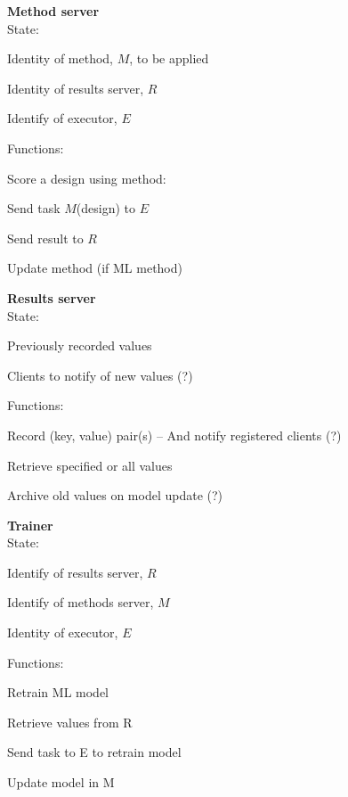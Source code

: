 \documentclass[10pt]{article}
\begin{document}
\noindent
\textbf{Method server}\\
State:
\begin{compactitem}
\item
Identity of method, $M$, to be applied
\item
Identity of results server, $R$
\item
Identify of executor, $E$
\end{compactitem}
Functions:
\begin{compactitem}
\item 
Score a design using method:
\begin{compactitem}
\item
Send task $M$(design) to $E$
\item
Send result to $R$
\end{compactitem}
\item
Update method (if ML method) 
\end{compactitem}

\vspace{1ex}

\noindent
\textbf{Results server}\\
State:
\begin{compactitem}
\item
Previously recorded values
\item
Clients to notify of new values (?)
\end{compactitem}
Functions:
\begin{compactitem}
\item
Record (key, value) pair(s) -- And notify registered clients (?)
\item
Retrieve specified or all values
\item
Archive old values on model update (?)
\end{compactitem}

\vspace{1ex}

\noindent
\textbf{Trainer}\\
State:
\begin{compactitem}
\item
Identify of results server, $R$
\item
Identify of methods server, $M$
\item
Identity of executor, $E$
\end{compactitem}
Functions:
\begin{compactitem}
\item
Retrain ML model
\item
Retrieve values from R
\item
Send task to E to retrain model 
\item
Update model in M
\end{compactitem}
\end{document}
